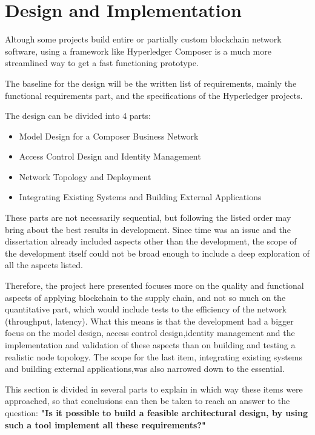\section{Design and Implementation}

Altough some projects build entire or partially custom blockchain network software, using a framework like Hyperledger Composer is a much more streamlined way to get a fast functioning prototype.

The baseline for the design will be the written list of requirements, mainly the functional requirements part, and the specifications of the Hyperledger projects.

The design can be divided into 4 parts:
\begin{itemize}
    \item Model Design for a Composer Business Network
    \item Access Control Design and Identity Management
    \item Network Topology and Deployment
    \item Integrating Existing Systems and Building External Applications
\end{itemize}

These parts are not necessarily sequential, but following the listed order may bring about the best results in development. Since time was an issue and the dissertation already included aspects other than the development, the scope of the development itself could not be broad enough to include a deep exploration of all the aspects listed.

Therefore, the project here presented focuses more on the quality and functional aspects of applying blockchain to the supply chain, and not so much on the quantitative part, which would include tests to the efficiency of the network (throughput, latency). What this means is that the development had a bigger focus on the model design, access control design,identity management and the implementation and validation of these aspects than on building and testing a realistic node topology. The scope for the last item, integrating existing systems and building external applications,was also narrowed down to the essential.

This section is divided in several parts to explain in which way these items were approached, so that conclusions can then be taken to reach an answer to the question: \textbf{"Is it possible to build a feasible architectural design, by using such a tool implement all these requirements?"}

